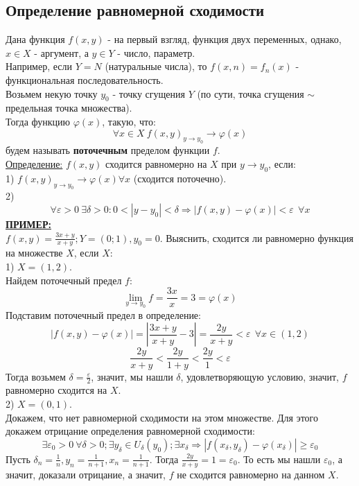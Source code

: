 \documentclass[12pt]{article}
\begin{document}
\subsection{Определение равномерной сходимости}
Дана функция $f(x,y)$ - на первый взгляд, функция двух переменных, однако, $x \in X$ - аргумент, а $y \in Y$ - число, параметр.\\
Например, если $Y = N$ (натуральные числа), то $f (x,n) = f_n (x)$ - функциональная последовательность.\\
Возьмем некую точку $y_0$ - точку сгущения $Y$ (по сути, точка сгущения $\sim$ предельная точка множества).\\
Тогда функцию $\varphi (x)$, такую, что:\\
$$\forall x \in X \ f(x,y)_{y\to y_0} \to \varphi(x)$$
будем называть \textbf{поточечным} пределом функции $f$.\\
\uline{Определение:}
$f(x,y)$ сходится равномерно на $X$ при $y \to y_0$, если:\\
1) $f(x,y)_{y\to y_0} \to \varphi (x) \forall x$ (сходится поточечно).\\
2) $$\forall \varepsilon > 0 \ \exists \delta > 0 : 0 < |y-y_0| < \delta \Rightarrow |f(x,y) - \varphi(x)|<\varepsilon \ \  \forall x$$
\uline{\textbf{ПРИМЕР:}}\\
$f(x,y) = \frac{3x+y}{x+y}; Y = (0;1), y_0 = 0$. Выяснить, сходится ли равномерно функция на множестве $X$, если $X$:\\
1) $X = (1,2)$.\\
Найдем поточечный предел $f$:\\
$$\lim_{y\to y_0} f = \frac{3x}{x} = 3 = \varphi(x)$$
Подставим поточечный предел в определение:\\
$$|f(x,y)-\varphi(x)| = |\frac{3x+y}{x+y} - 3| = \frac{2y}{x+y} < \varepsilon \ \ \forall x \in (1,2)$$
$$\frac{2y}{x+y} < \frac{2y}{1+y} < \frac{2y}{1} < \varepsilon$$
Тогда возьмем $\delta = \frac{\varepsilon}{2}$, значит, мы нашли $\delta$, удовлетворяющую условию, значит, $f$ равномерно сходится на $X$.\\
2) $X = (0,1)$.\\
Докажем, что нет равномерной сходимости на этом множестве. Для этого докажем отрицание определения равномерной сходимости:\\
$$\exists \varepsilon_0 > 0 \ \forall \delta > 0; \exists y_{\delta} \in U_{\delta} (y_0); \exists x_{\delta} \Rightarrow |f(x_{\delta}, y_{\delta})-\varphi(x_{\delta})| \geq \varepsilon_0$$
Пусть $\delta_n = \frac{1}{n}, y_n = \frac{1}{n+1}, x_n = \frac{1}{n+1}$. Тогда $\frac{2y}{x+y} = 1 = \varepsilon_0$. То есть мы нашли $\varepsilon_0$, а значит, доказали отрицание, а значит, $f$ не сходится равномерно на данном $X$.\\
\end{document}
